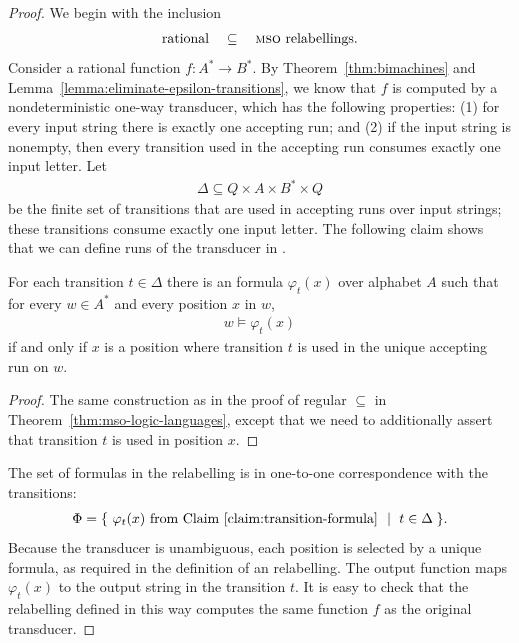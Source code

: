 \begin{proof}
    We begin with the inclusion 
    \begin{align*}
    \text{rational} \quad \subseteq \quad \text{\mso relabellings.}
    \end{align*}
    Consider a rational function $f : A^* \to B^*$. By Theorem~\ref{thm:bimachines} and Lemma~\ref{lemma:eliminate-epsilon-transitions}, we  know that $f$  is computed by a nondeterministic one-way transducer, which has the following properties: (1) for every input string there is exactly one accepting run; and (2) if the input string is nonempty, then every transition used in the accepting run consumes exactly one input letter.  Let 
    \begin{align*}
    \Delta \subseteq Q \times A \times B^* \times Q
    \end{align*}
    be the finite set of  transitions that are used in accepting runs over input strings; these transitions consume exactly one input letter.  The following claim shows that we can define runs of the transducer in \mso.  
    \begin{claim}\label{claim:transition-formula}
        For each transition $t \in \Delta$ there is an \mso formula $\varphi_t(x)$ over alphabet $A$ such that for every $w \in A^*$ and every position $x$ in $w$, 
    \begin{align*}
    w \models \varphi_t(x)
    \end{align*}
     if and only if $x$ is a position where transition $t$ is used in the unique accepting run on $w$. 
    \end{claim}
    \begin{proof}
        The same construction as in the proof of regular $\subseteq$ \mso in Theorem~\ref{thm:mso-logic-languages}, except that we need to additionally assert that transition $t$ is used in position $x$.
    \end{proof}
    The set of formulas in the \mso relabelling is in one-to-one correspondence with the transitions:
\begin{align*}
\Phi = \setbuild{\varphi_t(x) \text{ from Claim~\ref{claim:transition-formula} }}{$t \in \Delta$}.
\end{align*}
Because the transducer is unambiguous, each position is selected by a unique formula, as required in the definition of an \mso relabelling. The output function maps $\varphi_t(x)$ to the output string in the transition $t$. It is easy to check that the \mso relabelling defined in this way computes the same function $f$ as the original transducer.


\end{proof}
